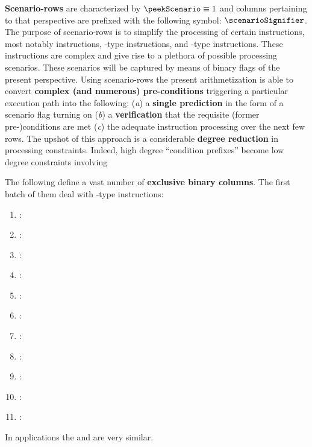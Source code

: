 \textbf{Scenario-rows} are characterized by $\peekScenario \equiv 1$ and columns pertaining to that perspective are prefixed with the following symbol: $\scenarioSignifier$. 
The purpose of scenario-rows is to simplify the processing of certain instructions, most notably
 instructions,
-type instructions, and
-type instructions.
These instructions are complex and give rise to a plethora of possible processing scenarios.
These scenarios will be captured by means of binary flags of the present perspective.
Using scenario-rows the present arithmetization is able to convert \textbf{complex (and numerous) pre-conditions} triggering a particular execution path into the following:
(\emph{a}) a \textbf{single prediction} in the form of a scenario flag turning on
(\emph{b}) a \textbf{verification} that the requisite (former pre-)conditions are met
(\emph{c}) the adequate instruction processing over the next few rows.
The upshot of this approach is a considerable \textbf{degree reduction} in processing constraints.
Indeed, high degree ``condition prefixes'' become low degree constraints involving 

The following define a vast number of \textbf{exclusive binary columns}. The first batch of them deal with -type instructions:
\begin{enumerate}
	\item \scenCallAbort:
	\item \scenCallToEoaCallerWontRevert:
	\item \scenCallToEoaCallerWillRevert:
	\item \scenCallToSmartContractCallerWontRevertCalleeSuccess:
	\item \scenCallToSmartContractCallerWontRevertCalleeFailure:
	\item \scenCallToSmartContractCallerWillRevertCalleeSuccess:
	\item \scenCallToSmartContractCallerWillRevertCalleeFailure:
	\item \scenCallToPrecompileSuccessCallerWontRevert:
	\item \scenCallToPrecompileSuccessCallerWillRevert:
	\item \scenCallToPrecompileFailureCallerWontRevert:
	\item \scenCallToPrecompileFailureCallerWillRevert:
\end{enumerate}
\saNote{} In applications the
\scenCallToPrecompileFailureCallerWontRevert{} and \scenCallToPrecompileFailureCallerWillRevert{}
are very similar.


